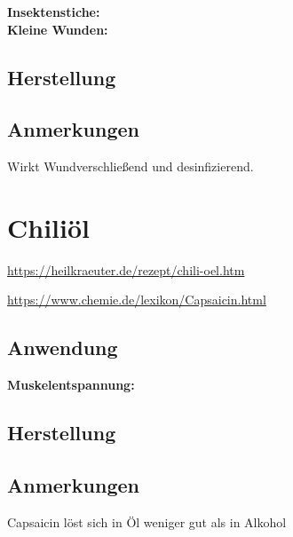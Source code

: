 \textbf{Insektenstiche:} \\ 

\textbf{Kleine Wunden:} \\

\subsection{Herstellung}

\subsection{Anmerkungen}

Wirkt Wundverschließend und desinfizierend.








\section{Chiliöl}


\url{https://heilkraeuter.de/rezept/chili-oel.htm}

\url{https://www.chemie.de/lexikon/Capsaicin.html}

                

\subsection{Anwendung}

\textbf{Muskelentspannung:}

\subsection{Herstellung}

\subsection{Anmerkungen}

Capsaicin löst sich in Öl weniger gut als in Alkohol







